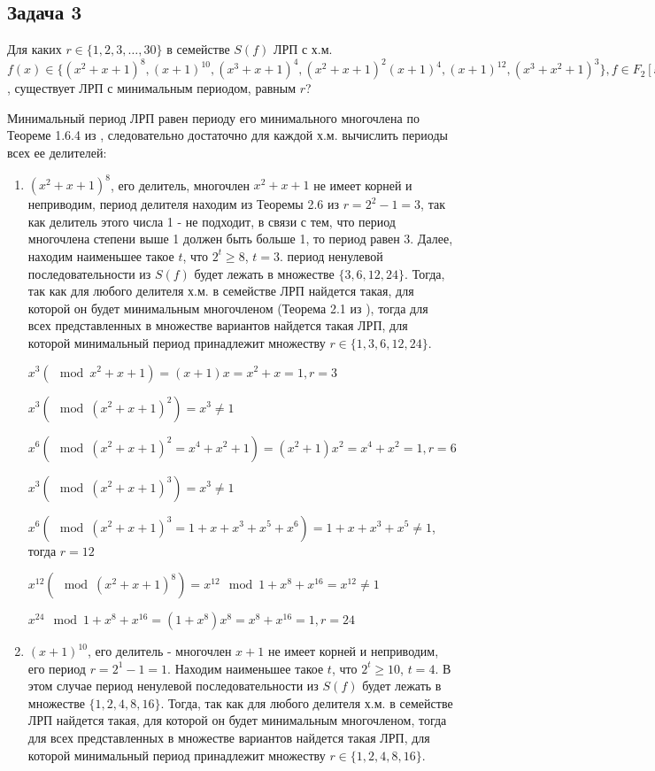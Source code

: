 \documentclass[utf8x, 14pt]{G7-32} %
\begin{document}
\subsection{Задача 3}
Для каких $r\in\{1,2,3,…,30\}$ в семействе $S(f)$ ЛРП с х.м. $f(x)\in\{(x^2+x+1)^8, (x+1)^{10}, (x^3+x+1)^4, (x^2+x+1)^2(x+1)^4, (x+1)^{12}, (x^3+x^2+1)^3\}, f\in F_2[x]$, существует ЛРП с минимальным периодом, равным $r$?

Минимальный период ЛРП равен периоду его минимального многочлена по Теореме 1.6.4 из \cite{hse:Teoria_Gener}, следовательно достаточно для каждой х.м. вычислить периоды всех ее делителей:

\begin{enumerate}
    \item $(x^2+x+1)^8$, его делитель, многочлен $x^2+x+1$ не имеет корней и неприводим, период делителя находим из Теоремы 2.6 из \cite{hse:Teoria_Gener} $r = 2^2 -1 = 3$, так как делитель этого числа 1 - не подходит, в связи с тем, что период многочлена степени выше 1 должен быть больше 1, то период равен $3$. Далее, находим наименьшее такое $t$, что $2^t \geq 8$, $t=3$.  период ненулевой последовательности из $S(f)$ будет лежать в множестве $\{3, 6, 12, 24\}$. Тогда, так как для любого делителя х.м. в семействе ЛРП найдется такая, для которой он будет минимальным многочленом (Теорема 2.1 из \cite{hse:Teoria_Gener}), тогда для всех представленных в множестве вариантов найдется такая ЛРП, для которой минимальный период принадлежит множеству $r \in \{1,3,6,12,24 \}$. 
    
    $x^3 (\mod x^2+x+1) = (x+1)x = x^2+x = 1, r = 3$
    
    $x^3 (\mod (x^2+x+1)^2) = x^3 \neq 1$
    
    $x^6 (\mod (x^2+x+1)^2 = x^4+x^2+1) = (x^2+1)x^2 = x^4+x^2 = 1, r = 6$
    
    $x^3 (\mod (x^2+x+1)^3) = x^3 \neq 1$
    
    $x^6 (\mod (x^2+x+1)^3 = 1 + x+ x^3+x^5+ x^6) = 1 + x+ x^3+x^5 \neq 1$, тогда $r = 12$
    
    $x^{12} (\mod (x^2+x+1)^8 ) = x^{12} \mod 1 + x^8 + x^{16} = x^{12} \neq 1$
    
    $x^{24} \mod 1 + x^8 + x^{16} = (1 + x^8) x^8 = x^8 + x^{16} = 1, r = 24$
    
    \item $(x+1)^{10}$, его делитель - многочлен $x+1$ не имеет корней и неприводим, его период $r = 2^1 -1 = 1$. Находим наименьшее такое $t$, что $2^t \geq 10$, $t=4$. В этом случае период ненулевой последовательности из $S(f)$ будет лежать в множестве $\{1, 2, 4, 8, 16\}$. Тогда, так как для любого делителя х.м. в семействе ЛРП найдется такая, для которой он будет минимальным многочленом, тогда для всех представленных в множестве вариантов найдется такая ЛРП, для которой минимальный период принадлежит множеству $r \in \{1, 2, 4, 8, 16\}$.
    

\end{enumerate}
\end{document}
